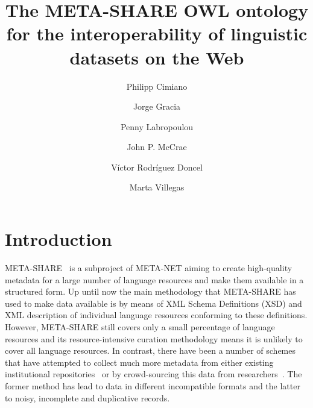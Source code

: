 \documentclass{llncs}
\begin{document}
\title{The META-SHARE OWL ontology for the interoperability of linguistic datasets on the Web}


%
%

\author{Philipp Cimiano \and Jorge Gracia \and Penny Labropoulou \and John P. McCrae \and V\'ictor Rodr\'iguez Doncel \and Marta Villegas}
%
%
%
    
\maketitle              %

\begin{abstract}
\end{abstract}

\section{Introduction}
\label{sec:introduction}

META-SHARE~\cite{piperidis2012meta} is a subproject of META-NET aiming to create high-quality metadata
for a large number of language resources and make them available in a structured
form. Up until now the main methodology that META-SHARE has used to make data
available is by means of XML Schema Definitions (XSD) and XML description of
individual language resources conforming to these definitions. However,
META-SHARE still covers only a small percentage of language resources and its
resource-intensive curation methodology means it is unlikely to cover all
language resources. In contrast, there have been a number of schemes that have
attempted to collect much more metadata from either existing institutional
repositories~\cite[CLARIN]{broeder2010data} or by crowd-sourcing this data from
researchers~\cite[LRE-Map]{calzolari2012lre}. The former method has lead to
data in different incompatible formats and the latter to noisy, incomplete and
duplicative records.
\end{document}
